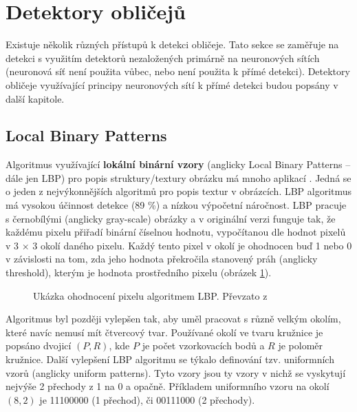 \section{Detektory obličejů}
\label{sekce:detektory_bez_neuronovych_siti}
Existuje několik různých přístupů k detekci obličeje. Tato sekce se zaměřuje na detekci s využitím detektorů nezaložených primárně na neuronových sítích (neuronová síť není použita vůbec, nebo není použita k přímé detekci). Detektory obličeje využívající principy neuronových sítí k přímé detekci budou popsány v další kapitole.

\subsection*{Local Binary Patterns}
Algoritmus využívající \textbf{lokální binární vzory} (anglicky Local Binary Patterns -- dále jen LBP) pro popis struktury/textury obrázku má mnoho aplikací \cite{localBinaryPatterns}. Jedná se o jeden z nejvýkonnějších algoritmů pro popis textur v obrázcích. LBP algoritmus má vysokou účinnost detekce (89 \%) \cite{localBinaryPatternsTests} a nízkou výpočetní náročnost.
LBP pracuje s černobílými (anglicky gray-scale) obrázky a v originální verzi funguje tak, že každému pixelu přiřadí binární číselnou hodnotu, vypočítanou dle hodnot pixelů v 3 $\times$ 3 okolí daného pixelu. Každý tento pixel v okolí je ohodnocen buď 1 nebo 0 v závislosti na tom, zda jeho hodnota překročila stanovený práh (anglicky threshold), kterým je hodnota prostředního pixelu (obrázek \ref{lbp}).

\begin{figure}[H]
  \begin{center}
  \label{lbp}
  \caption{Ukázka ohodnocení pixelu algoritmem LBP. Převzato z \cite{localBinaryPatterns}}
  \end{center}
\end{figure}

Algoritmus byl později vylepšen tak, aby uměl pracovat s různě velkým okolím, které navíc nemusí mít čtvercový tvar. Používané okolí ve tvaru kružnice je popsáno dvojicí $(P, R)$, kde $P$ je počet vzorkovacích bodů a $R$ je poloměr kružnice. Další vylepšení LBP algoritmu se týkalo definování tzv. uniformních vzorů (anglicky uniform patterns). Tyto vzory jsou ty vzory v nichž se vyskytují nejvýše 2 přechody z 1 na 0 a opačně. Příkladem uniformního vzoru na okolí $(8, 2)$ je 11100000 (1 přechod), či 00111000 (2 přechody). 

